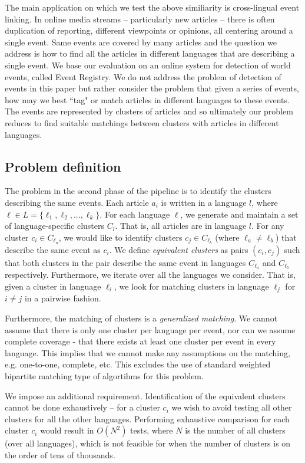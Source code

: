 \documentclass[twoside,11pt]{article}
\begin{document}
The main application on which we test the above similiarity is cross-lingual event linking. In online media streams -- particularly new articles -- there is often duplication of reporting, different viewpoints or opinions, all centering around a single event. Same events are covered by many articles and the question we address is how to find all the articles in different languages that are describing a single event. We base our evaluation on an online system for detection of world events, called Event Registry. We do not address the problem of detection of events in this paper but rather consider the problem that given a series of events, how may we best ``tag" or match articles in different languages to these events. The events are represented by clusters of articles and so ultimately our problem reduces to find suitable matchings between clusters with articles in different languages.

\subsection{Problem definition}

The problem in the second phase of the pipeline is to identify the clusters describing the same events. Each article $a_i$ is written in a language $l$, where $\ell \in L = \{\ell_1,\ell_2,...,\ell_k\}$. For each language $\ell$, we generate and maintain a set of language-specific clusters $C_l$. That is, all articles are in language $l$. For any cluster $c_i \in C_{\ell_a}$, we would like to identify clusters $c_j \in C_{\ell_b}$ (where $\ell_a \neq \ell_b$) that describe the same event as $c_i$. We define \emph{equivalent clusters} as  pairs $(c_i,c_j)$ such that both clusters in the pair describe the same event in languages $C_{\ell_a}$ and $C_{\ell_b}$ respectively. Furthermore, we iterate over all the languages we consider. That is, given a cluster in language $\ell_i$, we look for matching clusters in language $\ell_j$ for $i\neq j$  in a pairwise fashion. 

Furthermore, the matching of clusters is a \emph{generalized matching}. We cannot assume that there is only one cluster per language per event, nor can we assume complete coverage - that there exists at least one cluster per event in every language. This implies that we cannot make any assumptions on the matching, e.g. one-to-one, complete, etc. This excludes the use of standard weighted bipartite matching type of algortihms for this problem. 	


We impose an additional requirement.  Identification of the equivalent clusters cannot be done exhaustively -- for a cluster $c_i$ we wish to avoid testing all other clusters for all the other languages. Performing exhaustive comparison for each cluster $c_i$ would result in $O(N^2)$ tests, where $N$ is the number of all clusters (over all languages), which is not feasible for when the number of clusters is on the order of tens of thousands.
\end{document}
